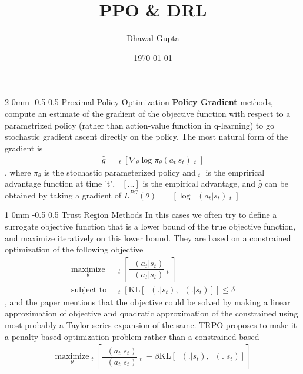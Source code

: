 \documentclass[twocolumn,11pt]{article}
\title{PPO \& DRL }
\author{Dhawal Gupta}
\date{\today}
\makeatletter
\DeclareMathOperator{\eE}{\hat{E}} %
\DeclareMathOperator{\pit}{\pi_\theta}
\DeclareMathOperator{\pito}{\pi_{\theta_{\text{old}}}}
\DeclareMathOperator{\eA}{\bar{A}} %
\renewcommand{\section}{\@startsection
{section}%
{2}%
{0mm}%
{-0.5\baselineskip}%
{0.5\baselineskip}%
{\bfseries\color{blue}}} %
\renewcommand{\subsection}{\@startsection
{subsection}%
{1}%
{0mm}%
{-0.5\baselineskip}%
{0.5\baselineskip}%
{\bfseries\color{blue}}} %
\makeatother
\begin{document}
\maketitle

\section{Proximal Policy Optimization}
\textbf{Policy  Gradient} methods, compute an estimate  of the gradient of the objective function with respect to a parametrized policy (rather than action-value function in q-learning) to go stochastic gradient ascent directly on the policy. The most natural form of the gradient  is \useshortskip
\begin{align*}
\hat{g} = \eE_t \left[ \nabla_\theta \log \pi_\theta ( a_t \ s_t) \eA_t \right]
\end{align*}, where $\pi_\theta$ is the stochastic parameterized policy and$\eA_t$ is the emprirical advantage function at time 't', $\eE[\dots]$ is the empirical advantage, and $\hat{g}$ can be obtained by taking a gradient of $L^{PG}(\theta) = \eE \left[ \log \pit (a_t|s_t) \eA_t\right]$

\subsection{Trust Region Methods}
In this cases we often try to define a surrogate objective function that is a lower bound of the true objective function, and maximize iteratively on this lower bound. They are based on a constrained optimization of the following objective \useshortskip
\begin{align*}
\underset{\theta}{\text{maximize}} &\eE_t\left[ \dfrac{\pit(a_t | s_t)}{\pito(a_t | s_t)} \eA_t \right] \\
\text{subject to } & \eE_t \left[ \text{KL} [ \pito( . | s_t), \pit(. | s_t)]\right] \leq \delta
\end{align*}, and the paper mentions that the objective could be solved by making a linear approximation of objective and quadratic approximation of the constrained using most probably a Taylor series expansion of the same.
TRPO proposes to make it a penalty based optimization problem rather than a constrained based \useshortskip
\begin{align} \label{eq:kl_penalty }\underset{\theta}{\text{maximize}} \eE_t\left[ \dfrac{\pit(a_t | s_t)}{\pito(a_t | s_t)} \eA_t - \beta \text{KL} [ \pito( . | s_t), \pit(. | s_t)]\right] 
\end{align}
\end{document}
